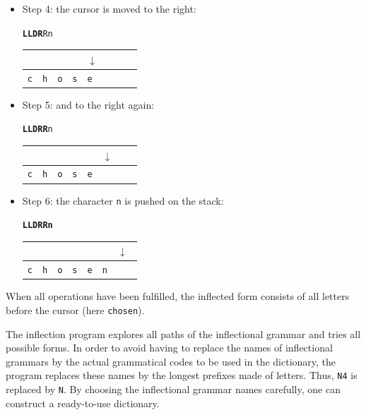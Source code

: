 \begin{itemize}
\bigskip
\item Step 4: the cursor is moved to the right:

\begin{center}
\texttt{\textbf{LLDR}Rn}

\begin{tabular}{|l|l|l|l|l|l|l|l}
\multicolumn{4}{l}{} & \multicolumn{4}{l}{$\downarrow$} \\
\hline
\verb+c+ & \verb+h+ & \verb+o+ & \verb+s+ & \verb+e+ & \verb+ + & \verb+ + & \\
\hline
\end{tabular}
\end{center}

\bigskip
\item Step 5: and to the right again:

\begin{center}
\texttt{\textbf{LLDRR}n}

\begin{tabular}{|l|l|l|l|l|l|l|l}
\multicolumn{5}{l}{} & \multicolumn{3}{l}{$\downarrow$} \\
\hline
\verb+c+ & \verb+h+ & \verb+o+ & \verb+s+ & \verb+e+ & \verb+ + & \verb+ + & \\
\hline
\end{tabular}
\end{center}

\bigskip
\item Step 6: the character \verb+n+ is pushed on the stack:

\begin{center}
\texttt{\textbf{LLDRRn}}

\begin{tabular}{|l|l|l|l|l|l|l|l}
\multicolumn{6}{l}{} & \multicolumn{2}{l}{$\downarrow$} \\
\hline
\verb+c+ & \verb+h+ & \verb+o+ & \verb+s+ & \verb+e+ & \verb+n+ & \verb+ + & \\
\hline
\end{tabular}
\end{center}
\end{itemize}

\bigskip
\noindent When all operations have been fulfilled, the inflected form
consists of all letters before the cursor (here \verb+chosen+).

\bigskip
\noindent The inflection program
explores all paths of the inflectional grammar and tries all possible forms. In
order to avoid having to replace the names of inflectional grammars by the actual
grammatical codes to be used in the dictionary, the program replaces these names by the
longest prefixes made of letters.
Thus, \verb+N4+ is replaced by \verb+N+. By choosing the inflectional
grammar names carefully, one can construct a ready-to-use dictionary.

